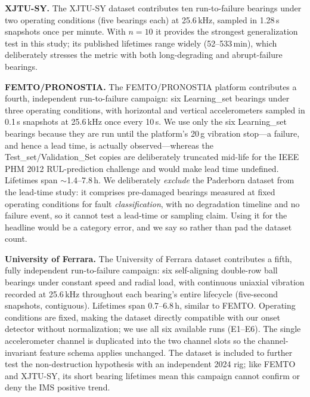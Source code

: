 \documentclass[journal]{IEEEtran}
\begin{document}
\textbf{XJTU-SY.} The XJTU-SY dataset \cite{wang2020} contributes ten
run-to-failure bearings under two operating conditions (five bearings each) at
25.6\,kHz, sampled in 1.28\,s snapshots once per minute. With $n{=}10$ it
provides the strongest generalization test in this study; its published
lifetimes range widely (52--533\,min), which deliberately stresses the metric
with both long-degrading and abrupt-failure bearings.

\textbf{FEMTO/PRONOSTIA.} The FEMTO/PRONOSTIA platform \cite{nectoux2012}
contributes a fourth, independent run-to-failure campaign: six Learning\_set
bearings under three operating conditions, with horizontal and vertical
accelerometers sampled in 0.1\,s snapshots at 25.6\,kHz once every 10\,s. We use
only the six Learning\_set bearings because they are run until the platform's
20\,g vibration stop---a failure, and hence a lead time, is actually
observed---whereas the Test\_set/Validation\_Set copies are deliberately
truncated mid-life for the IEEE PHM 2012 RUL-prediction challenge and would make
lead time undefined. Lifetimes span $\sim$1.4--7.8\,h. We deliberately
\emph{exclude} the Paderborn dataset \cite{lessmeier2016} from the lead-time
study: it comprises pre-damaged bearings measured at fixed operating conditions
for fault \emph{classification}, with no degradation timeline and no failure
event, so it cannot test a lead-time or sampling claim. Using it for the
headline would be a category error, and we say so rather than pad the dataset
count.

\textbf{University of Ferrara.} The University of Ferrara dataset \cite{arpa2024}
contributes a fifth, fully independent run-to-failure campaign: six self-aligning
double-row ball bearings under constant speed and radial load, with continuous
uniaxial vibration recorded at 25.6\,kHz throughout each bearing's entire lifecycle
(five-second snapshots, contiguous). Lifetimes span $0.7$--$6.8$\,h, similar to
FEMTO. Operating conditions are fixed, making the dataset directly compatible with
our onset detector without normalization; we use all six available runs (E1--E6).
The single accelerometer channel is duplicated into the two channel slots so the
channel-invariant feature schema applies unchanged. The dataset is included to
further test the non-destruction hypothesis with an independent 2024 rig; like FEMTO
and XJTU-SY, its short bearing lifetimes mean this campaign cannot confirm or deny
the IMS positive trend.
\end{document}

